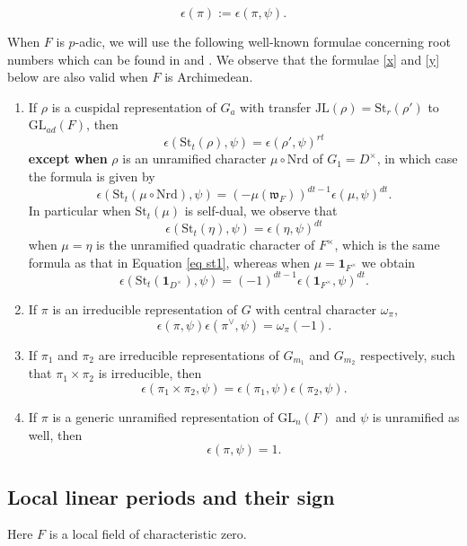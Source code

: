 \documentclass[11pt,letterpaper]{amsart}
\newcommand{\GL}{{\mathrm {GL}}} \newcommand{\PGL}{{\mathrm {PGL}}}
\newcommand{\triv}{{\mathbf{1}}}
\newcommand{\JL}{{\mathrm{JL}}}
\newcommand{\nrd}{{\mathrm{Nrd}}}
\def\e{\epsilon}
\def\St{\mathrm{St}}
\theoremstyle{plain}
\numberwithin{equation}{section}
\begin{document}
\[\e(\pi):=\e(\pi,\psi).\] 


When $F$ is $p$-adic, we will use the following well-known formulae concerning root numbers which can be found in \cite{GJ} and \cite{GR}. We observe that the formulae \eqref{x} and \eqref{y} below are also valid when $F$ is Archimedean. 

\begin{enumerate}
\item If $\rho$ is a cuspidal representation of $G_a$ with transfer $\JL(\rho)=\St_r(\rho')$ to $\GL_{ad}(F)$, 
then \[\e( \St_t(\rho),\psi)=\e( \rho',\psi)^{rt}\] \textbf{except when} $\rho$ is an unramified character $\mu\circ \nrd$ of $G_1=D^\times$, in which case the formula is given by 
\begin{equation}\label{eq st1} \e( \St_t(\mu\circ \nrd),\psi)=(-\mu(\mathfrak{w}_F))^{dt-1}\e(\mu,\psi)^{dt}.\end{equation} In particular when $\St_t(\mu)$ is self-dual, we observe that 
\[\e( \St_t(\eta),\psi)=\e(\eta,\psi)^{dt}\] when $\mu=\eta$ is the unramified quadratic character of $F^\times$, which is the same formula as that in Equation \eqref{eq st1}, whereas when $\mu=\triv_{F^\times}$ we obtain 
\[\e( \St_t(\triv_{D^\times}),\psi)=(-1)^{dt-1}\e(\triv_{F^\times},\psi)^{dt}.\] 
\item \label{x} If $\pi$ is an irreducible representation of $G$ with central character $\omega_{\pi}$,
\[\e( \pi,\psi)\e( \pi^\vee,\psi)=\omega_{\pi}(-1).\] 
\item \label{y} If $\pi_1$ and $\pi_2$ are irreducible representations of $G_{m_1}$ and $G_{m_2}$ respectively, such that $\pi_1\times \pi_2$ is irreducible, then 
\[\e(\pi_1\times \pi_2,\psi)=\e(\pi_1,\psi)\e(\pi_2,\psi).\]
\item If $\pi$ is a generic unramified representation of $\GL_n(F)$ and $\psi$ is unramified as well, then \[\e( \pi,\psi)=1.\]
\end{enumerate}



\subsection{Local linear periods and their sign}\label{sec lin per}

Here $F$ is a local field of characteristic zero.
\end{document}
